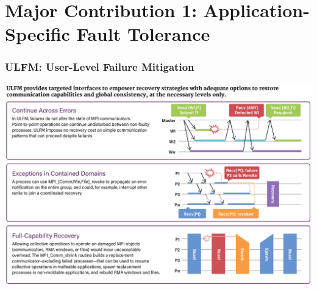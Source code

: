 \section[Major Contribution 1]{Major Contribution 1: Application-Specific Fault Tolerance}

\begin{frame}
  \frametitle{ULFM: User-Level Failure Mitigation}

  \centering\includegraphics[height=.85\textheight]{ulfm.png}

\end{frame}



